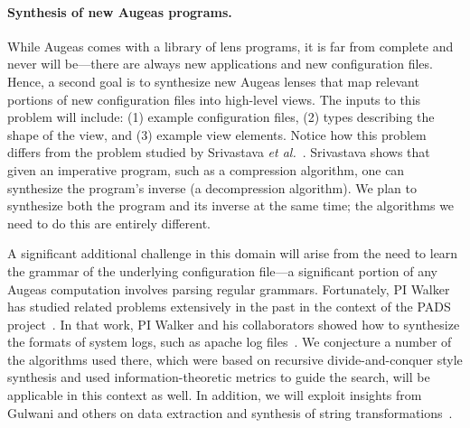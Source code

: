 \paragraph*{Synthesis of new Augeas programs.}  
While Augeas comes with a library of lens programs, it is far from
complete and never will be---there are always new applications 
and new configuration files.
Hence, a second goal is to synthesize new Augeas lenses that map
relevant portions of new configuration files into high-level views.
The inputs to this problem will include:  (1) example configuration
files, (2) types describing the shape of the view, and (3) example
view elements.  
Notice how this problem differs from the problem studied by
Srivastava \emph{et al.}~\cite{srivastava-pldi-2011}.  Srivastava
shows that given an imperative program, such as a compression algorithm,
one can synthesize the program's inverse (a decompression algorithm).  We plan to synthesize
both the program and its inverse at the same time; the algorithms
we need to do this are entirely different.

A significant additional challenge in this domain will arise from
the need to learn the grammar of the underlying configuration
file---a significant portion of any Augeas computation involves
parsing regular grammars.  Fortunately, PI Walker has studied related problems
extensively in the past in the context of the PADS project~\cite{fisher+:pads,fisher+:popl06,fisher+:jacm}.
In that work, PI Walker and his collaborators showed how to
synthesize the formats of system logs, such as apache log files~\cite{fisher-popl-2008,qian:markup}.
We conjecture a number of the algorithms used there,
which were based on recursive divide-and-conquer style
synthesis and used information-theoretic metrics to guide the search, 
will be applicable in this context as well.  In addition, we will exploit
insights from Gulwani and others on data extraction and
synthesis of string transformations~\cite{itzhaky-oopsla-2010,harris-pldi-2011,gulwani-ppdp-2010,vu-pldi-2014}.





